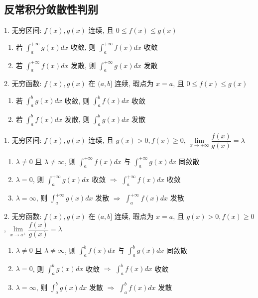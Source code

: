 \subsection*{反常积分敛散性判别}
\begin{theorem}[比较判别法]
	1. 无穷区间: $f(x),g(x)$ 连续, 且 $0 \leq f(x) \leq g(x)$
	\begin{enumerate}
		\item 若 $\int_{a}^{+\infty}g(x)dx$ 收敛, 则 $\int_{a}^{+\infty}f(x)dx$ 收敛
		\item 若 $\int_{a}^{+\infty}f(x)dx$ 发散, 则 $\int_{a}^{+\infty}g(x)dx$ 发散
	\end{enumerate}

	2. 无穷函数: $f(x),g(x)$ 在 $(a,b]$ 连续, 瑕点为 $x=a$, 且 $0\leq f(x)\leq g(x)$
	\begin{enumerate}
		\item 若 $\int_{a}^{b}g(x)dx$ 收敛, 则 $\int_{a}^{b}f(x)dx$ 收敛
		\item 若 $\int_{a}^{b}f(x)dx$ 发散, 则 $\int_{a}^{b}g(x)dx$ 发散
	\end{enumerate}
\end{theorem}

\begin{theorem}[比较判别法的极限形式]
	1. 无穷区间: $f(x),g(x)$ 连续, 且 $g(x)>0, f(x)\geq 0$, $\lim\limits_{x\to +\infty}\dfrac{f(x)}{g(x)}=\lambda$
	\begin{enumerate}
		\item $\lambda\neq 0$ 且 $\lambda \neq \infty$, 则 $\int_{a}^{+\infty}f(x)dx$ 与 $\int_{a}^{+\infty}g(x)dx$ 同敛散
		\item $\lambda = 0$, 则 $\int_{a}^{+\infty}g(x)dx$ 收敛 $\Rightarrow$ $\int_{a}^{+\infty}f(x)dx$ 收敛
		\item $\lambda = \infty$, 则 $\int_{a}^{+\infty}g(x)dx$ 发散 $\Rightarrow$ $\int_{a}^{+\infty}f(x)dx$ 发散
	\end{enumerate}

	2. 无穷函数: $f(x),g(x)$ 在 $(a,b]$ 连续, 瑕点为 $x=a$, 且 $g(x)>0, f(x)\geq 0$, $\lim\limits_{x\to a^{+}}\dfrac{f(x)}{g(x)}=\lambda$
	\begin{enumerate}
		\item $\lambda\neq 0$ 且 $\lambda \neq \infty$, 则 $\int_{a}^{b}f(x)dx$ 与 $\int_{a}^{b}g(x)dx$ 同敛散
		\item $\lambda = 0$, 则 $\int_{a}^{b}g(x)dx$ 收敛 $\Rightarrow$ $\int_{a}^{b}f(x)dx$ 收敛
		\item $\lambda = \infty$, 则 $\int_{a}^{b}g(x)dx$ 发散 $\Rightarrow$ $\int_{a}^{b}f(x)dx$ 发散
	\end{enumerate}
\end{theorem}

